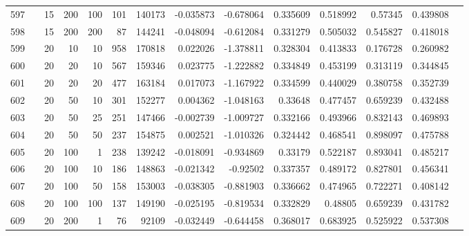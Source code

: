 \begin{longtable}{llrrrrrrrrrrrr}
		597 & &           15 &               200 &          100 &         101 &     140173 & -0.035873 & -0.678064 &  0.335609 &    0.518992 &        0.57345 &  0.439808 \\
		598 & &           15 &               200 &          200 &          87 &     144241 & -0.048094 & -0.612084 &  0.331279 &    0.505032 &       0.545827 &  0.418018 \\
		599 & &           20 &                10 &           10 &         958 &     170818 &  0.022026 & -1.378811 &  0.328304 &    0.413833 &       0.176728 &  0.260982 \\
		600 & &           20 &                20 &           10 &         567 &     159346 &  0.023775 & -1.222882 &  0.334849 &    0.453199 &       0.313119 &  0.344845 \\
		601 & &           20 &                20 &           20 &         477 &     163184 &  0.017073 & -1.167922 &  0.334599 &    0.440029 &       0.380758 &  0.352739 \\
		602 & &           20 &                50 &           10 &         301 &     152277 &  0.004362 & -1.048163 &   0.33648 &    0.477457 &       0.659239 &  0.432488 \\
		603 & &           20 &                50 &           25 &         251 &     147466 & -0.002739 & -1.009727 &  0.332166 &    0.493966 &       0.832143 &  0.469893 \\
		604 & &           20 &                50 &           50 &         237 &     154875 &  0.002521 & -1.010326 &  0.324442 &    0.468541 &       0.898097 &  0.475788 \\
		605 & &           20 &               100 &            1 &         238 &     139242 & -0.018091 & -0.934869 &   0.33179 &    0.522187 &       0.893041 &  0.485217 \\
		606 & &           20 &               100 &           10 &         186 &     148863 & -0.021342 &  -0.92502 &  0.337357 &    0.489172 &       0.827801 &  0.456341 \\
		607 & &           20 &               100 &           50 &         158 &     153003 & -0.038305 & -0.881903 &  0.336662 &    0.474965 &       0.722271 &  0.408142 \\
		608 & &           20 &               100 &          100 &         137 &     149190 & -0.025195 & -0.819534 &  0.332829 &     0.48805 &       0.659239 &  0.431782 \\
		609 & &           20 &               200 &            1 &          76 &      92109 & -0.032449 & -0.644458 &  0.368017 &    0.683925 &       0.525922 &  0.537308 \\

\end{longtable}
